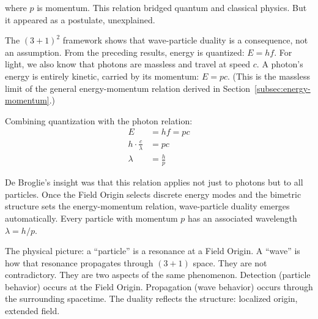 \documentclass[aps,prd,preprint,superscriptaddress,showpacs,preprintnumbers,amsmath,amssymb,nofootinbib]{revtex4-2}
\begin{document}
where $p$ is momentum. This relation bridged quantum and classical physics. But it appeared as a postulate, unexplained.

The $(3+1)^2$ framework shows that wave-particle duality is a consequence, not an assumption. From the preceding results, energy is quantized: $E = hf$. For light, we also know that photons are massless and travel at speed $c$. A photon's energy is entirely kinetic, carried by its momentum: $E = pc$. (This is the massless limit of the general energy-momentum relation derived in Section~\ref{subsec:energy-momentum}.)

Combining quantization with the photon relation:
\begin{align}
E &= hf = pc \\
h \cdot \frac{c}{\lambda} &= pc \\
\lambda &= \frac{h}{p}
\end{align}

De Broglie's insight was that this relation applies not just to photons but to all particles. Once the Field Origin selects discrete energy modes and the bimetric structure sets the energy-momentum relation, wave-particle duality emerges automatically. Every particle with momentum $p$ has an associated wavelength $\lambda = h/p$.

\vspace{1em}
\noindent
{}
\vspace{1cm}

The physical picture: a ``particle'' is a resonance at a Field Origin. A ``wave'' is how that resonance propagates through $(3+1)$ space. They are not contradictory. They are two aspects of the same phenomenon. Detection (particle behavior) occurs at the Field Origin. Propagation (wave behavior) occurs through the surrounding spacetime. The duality reflects the structure: localized origin, extended field.
\end{document}
